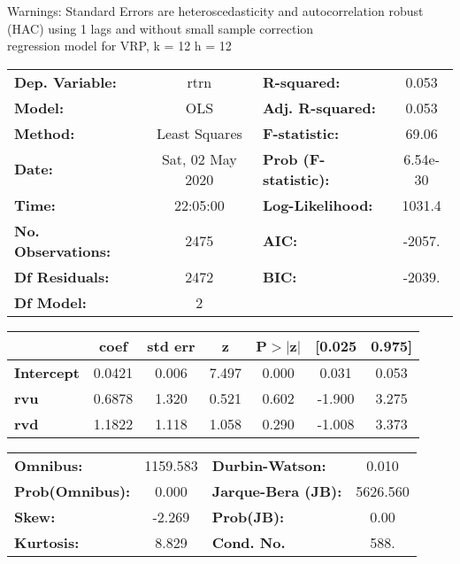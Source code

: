 Warnings: \newline
 [1] Standard Errors are heteroscedasticity and autocorrelation robust (HAC) using 1 lags and without small sample correction\\ 

regression model for VRP, k = 12 h = 12\begin{center}
\begin{tabular}{lclc}
\toprule
\textbf{Dep. Variable:}    &       rtrn       & \textbf{  R-squared:         } &     0.053   \\
\textbf{Model:}            &       OLS        & \textbf{  Adj. R-squared:    } &     0.053   \\
\textbf{Method:}           &  Least Squares   & \textbf{  F-statistic:       } &     69.06   \\
\textbf{Date:}             & Sat, 02 May 2020 & \textbf{  Prob (F-statistic):} &  6.54e-30   \\
\textbf{Time:}             &     22:05:00     & \textbf{  Log-Likelihood:    } &    1031.4   \\
\textbf{No. Observations:} &        2475      & \textbf{  AIC:               } &    -2057.   \\
\textbf{Df Residuals:}     &        2472      & \textbf{  BIC:               } &    -2039.   \\
\textbf{Df Model:}         &           2      & \textbf{                     } &             \\
\bottomrule
\end{tabular}
\begin{tabular}{lcccccc}
                   & \textbf{coef} & \textbf{std err} & \textbf{z} & \textbf{P$> |$z$|$} & \textbf{[0.025} & \textbf{0.975]}  \\
\midrule
\textbf{Intercept} &       0.0421  &        0.006     &     7.497  &         0.000        &        0.031    &        0.053     \\
\textbf{rvu}       &       0.6878  &        1.320     &     0.521  &         0.602        &       -1.900    &        3.275     \\
\textbf{rvd}       &       1.1822  &        1.118     &     1.058  &         0.290        &       -1.008    &        3.373     \\
\bottomrule
\end{tabular}
\begin{tabular}{lclc}
\textbf{Omnibus:}       & 1159.583 & \textbf{  Durbin-Watson:     } &    0.010  \\
\textbf{Prob(Omnibus):} &   0.000  & \textbf{  Jarque-Bera (JB):  } & 5626.560  \\
\textbf{Skew:}          &  -2.269  & \textbf{  Prob(JB):          } &     0.00  \\
\textbf{Kurtosis:}      &   8.829  & \textbf{  Cond. No.          } &     588.  \\
\bottomrule
\end{tabular}
\end{center}

